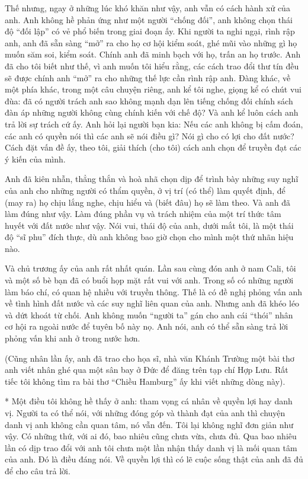 Thế nhưng, ngay ở những lúc khó khăn như vậy, anh vẫn có cách hành xử của anh. Anh không hề phản ứng như một người “chống đối”, anh không chọn thái độ “đối lập” có vẻ phổ biến trong giai đoạn ấy. Khi người ta nghi ngại, rình rập anh, anh đã sẵn sàng “mở” ra cho họ cơ hội kiểm soát, ghé mũi vào những gì họ muốn săm soi, kiểm soát. Chính anh đã minh bạch với họ, trấn an họ trước. Anh đã cho tôi biết như thế, vì anh muốn tôi hiểu rằng, các cách trao đổi thư tín đều sẽ được chính anh “mở” ra cho những thế lực cần rình rập anh. Đàng khác, về một phía khác, trong một câu chuyện riêng, anh kể tôi nghe, giọng kể có chút vui đùa: đã có người trách anh sao không mạnh dạn lên tiếng chống đối chính sách đàn áp những người không cùng chính kiến với chế độ? Và anh kể luôn cách anh trả lời sự trách cứ ấy. Anh hỏi lại người bạn kia: Nếu các anh không bị cấm đoán, các anh có quyền nói thì các anh sẽ nói điều gì? Nói gì cho có lợi cho đất nước? Cách đặt vấn đề ấy, theo tôi, giải thích (cho tôi) cách anh chọn để truyền đạt các ý kiến của mình.

Anh đã kiên nhẫn, thẳng thắn và hoà nhã chọn dịp để trình bày những suy nghĩ của anh cho những người có thẩm quyền, ở vị trí (có thể) làm quyết định, để (may ra) họ chịu lắng nghe, chịu hiểu và (biết đâu) họ sẽ làm theo. Và anh đã làm đúng như vậy. Làm đúng phần vụ và trách nhiệm của một trí thức tâm huyết với đất nước như vậy. Nói vui, thái độ của anh, dưới mắt tôi, là một thái độ “sĩ phu” đích thực, dù anh không bao giờ chọn cho mình một thứ nhãn hiệu nào.

Và chủ trương ấy của anh rất nhất quán. Lần sau cùng đón anh ở nam Cali, tôi và một số bè bạn đã có buổi họp mặt rất vui với anh. Trong số có những người làm báo chí, có quan hệ nhiều với truyền thông. Thế là có đề nghị phỏng vấn anh về tình hình đất nước và các suy nghĩ liên quan của anh. Nhưng anh đã khéo léo và dứt khoát từ chối. Anh không muốn “người ta” gán cho anh cái “thói” nhân cơ hội ra ngoài nước để tuyên bố này nọ. Anh nói, anh có thể sẵn sàng trả lời phỏng vấn khi anh ở trong nước hơn.

(Cũng nhân lần ấy, anh đã trao cho họa sĩ, nhà văn Khánh Trường một bài thơ anh viết nhân ghé qua một sân bay ở Đức để đăng trên tạp chí Hợp Lưu. Rất tiếc tôi không tìm ra bài thơ “Chiều Hamburg” ấy khi viết những dòng này).

*
Một điều tôi không hề thấy ở anh: tham vọng cá nhân về quyền lợi hay danh vị. Người ta có thể nói, với những đóng góp và thành đạt của anh thì chuyện danh vị anh không cần quan tâm, nó vẫn đến. Tôi lại không nghĩ đơn giản như vậy. Có những thứ, với ai đó, bao nhiêu cũng chưa vừa, chưa đủ. Qua bao nhiêu lần có dịp trao đổi với anh tôi chưa một lần nhận thấy danh vị là mối quan tâm của anh. Đó là điều đáng nói. Về quyền lợi thì có lẽ cuộc sống thật của anh đã đủ để cho câu trả lời.

